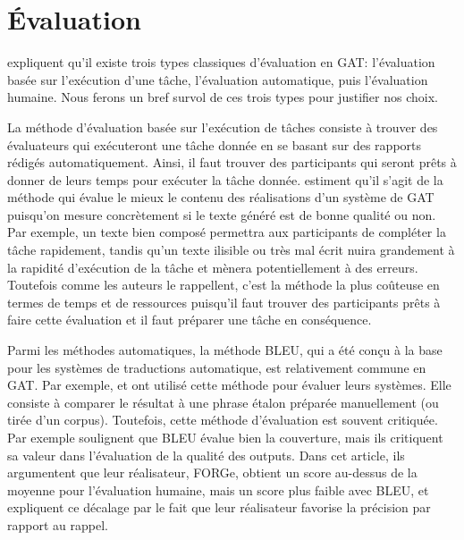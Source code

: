 
\chapter{Évaluation}\label{ch:eval}

\cite{ReiterInvestigationValidityMetrics2009} expliquent qu'il existe trois types classiques d'évaluation en \ac{GAT}: l'évaluation basée sur l'exécution d'une tâche, l'évaluation automatique, puis l'évaluation humaine. Nous ferons un bref survol de ces trois types pour justifier nos choix.

La méthode d'évaluation basée sur l'exécution de tâches consiste à trouver des évaluateurs qui exécuteront une tâche donnée en se basant sur des rapports rédigés automatiquement. Ainsi, il faut trouver des participants qui seront prêts à donner de leurs temps pour exécuter la tâche donnée. \cite{ReiterInvestigationValidityMetrics2009} estiment qu'il s'agit de la méthode qui évalue le mieux le contenu des réalisations d'un système de \ac{GAT} puisqu'on mesure concrètement si le texte généré est de bonne qualité ou non. Par exemple, un texte bien composé permettra aux participants de compléter la tâche rapidement, tandis qu'un texte ilisible ou très mal écrit nuira grandement à la rapidité d'exécution de la tâche et mènera potentiellement à des erreurs. Toutefois comme les auteurs le rappellent, c'est la méthode la plus coûteuse en termes de temps et de ressources puisqu'il faut trouver des participants prêts à faire cette évaluation et il faut préparer une tâche en conséquence.

Parmi les méthodes automatiques, la méthode BLEU, qui a été conçu à la base pour les systèmes de traductions automatique, est relativement commune en \ac{GAT}. Par exemple, \cite{Langkilde-gearyForestbasedstatisticalsentence2000} et \cite{Habash2003MatadorAL} ont utilisé cette méthode pour évaluer leurs systèmes. Elle consiste à comparer le résultat à une phrase étalon préparée manuellement (ou tirée d'un corpus). Toutefois, cette méthode d'évaluation est souvent critiquée. Par exemple \cite{DBLP:conf/semeval/MilleCBW17} soulignent que BLEU évalue bien la couverture, mais ils critiquent sa valeur dans l'évaluation de la qualité des outputs. Dans cet article, ils argumentent que leur réalisateur, FORGe, obtient un score au-dessus de la moyenne pour l'évaluation humaine, mais un score plus faible avec BLEU, et expliquent ce décalage par le fait que leur réalisateur favorise la précision par rapport au rappel.

